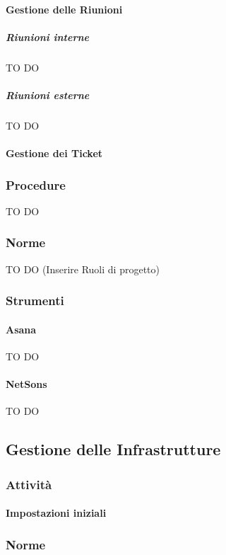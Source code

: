 			\paragraph{Gestione delle Riunioni}
				\subparagraph{Riunioni interne}
TO DO				
				\subparagraph{Riunioni esterne}
TO DO			

			\paragraph{Gestione dei Ticket} \label{sec:gestione_dei_ticket}
			
		\subsubsection{Procedure}
TO DO
		\subsubsection{Norme}
TO DO (Inserire Ruoli di progetto)

	
		\subsubsection{Strumenti}
			\paragraph{Asana} \label{sec:Asana}
TO DO
			\paragraph{NetSons}
TO DO
			
			\paragraph{}
	\subsection{Gestione delle Infrastrutture}
		\subsubsection{Attività}
			\paragraph{Impostazioni iniziali}
			
		\subsubsection{Norme}

